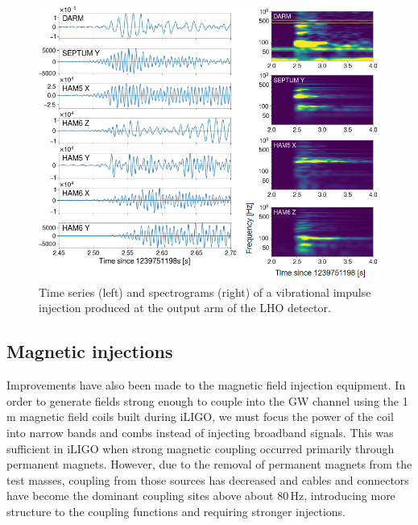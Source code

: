 \begin{figure}[h!]
	\centering
	\includegraphics[width=\textwidth]{figures/impulse.png}
	\caption{
		Time series (left) and spectrograms (right) of a vibrational impulse injection produced at the output arm of the LHO detector.}
	\label{fig:impulse}
\end{figure}


\subsection{Magnetic injections}\label{sec:magnetic-injections}

Improvements have also been made to the magnetic field injection equipment. In order to generate fields strong enough to couple into the \ac{GW} channel using the 1\,m magnetic field coils built during \ac{iLIGO}, we must focus the power of the coil into narrow bands and combs instead of injecting broadband signals. This was sufficient in \ac{iLIGO} when strong magnetic coupling occurred primarily through permanent magnets. However, due to the removal of permanent magnets from the test masses, coupling from those sources has decreased and cables and connectors have become the dominant coupling sites above about 80\,Hz, introducing more structure to the coupling functions and requiring stronger injections.

